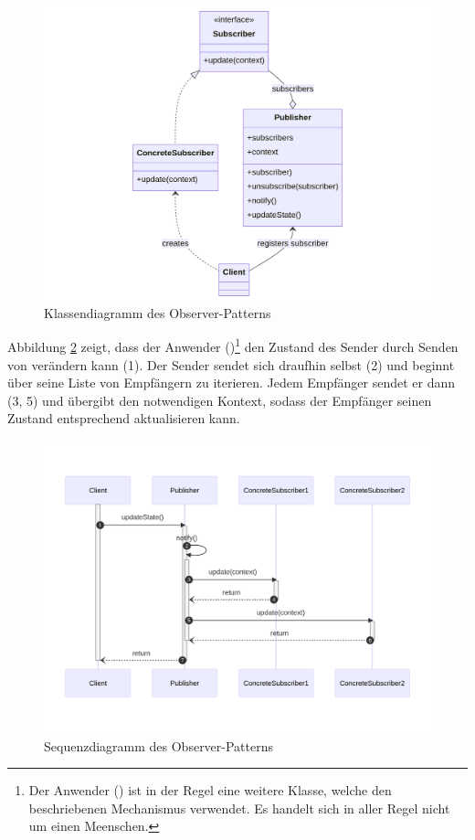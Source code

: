 \begin{figure}[htb]
	\centering
	\includegraphics[width=0.95\linewidth]{images/patterns/observer-class.png}
	\caption{Klassendiagramm des Observer-Patterns \cite{skobeleva_observer_2023}}
	\label{fig:observer-class}
\end{figure}

Abbildung \ref{fig:observer-seq} zeigt, dass der Anwender ()\footnote{Der Anwender () ist in der Regel eine weitere Klasse, welche den beschriebenen Mechanismus verwendet. Es handelt sich in aller Regel nicht um einen Meenschen.} den Zustand des Sender durch Senden von  verändern kann (1). Der Sender sendet sich draufhin selbst  (2) und beginnt über seine Liste von Empfängern zu iterieren. Jedem Empfänger sendet er dann  (3, 5) und übergibt den notwendigen Kontext, sodass der Empfänger seinen Zustand entsprechend aktualisieren kann.

\begin{figure}[htb]
	\centering
	\includegraphics[width=0.95\linewidth]{images/patterns/observer-seq.png}
	\caption{Sequenzdiagramm des Observer-Patterns \cite{skobeleva_observer_2023}}
	\label{fig:observer-seq}
\end{figure}

